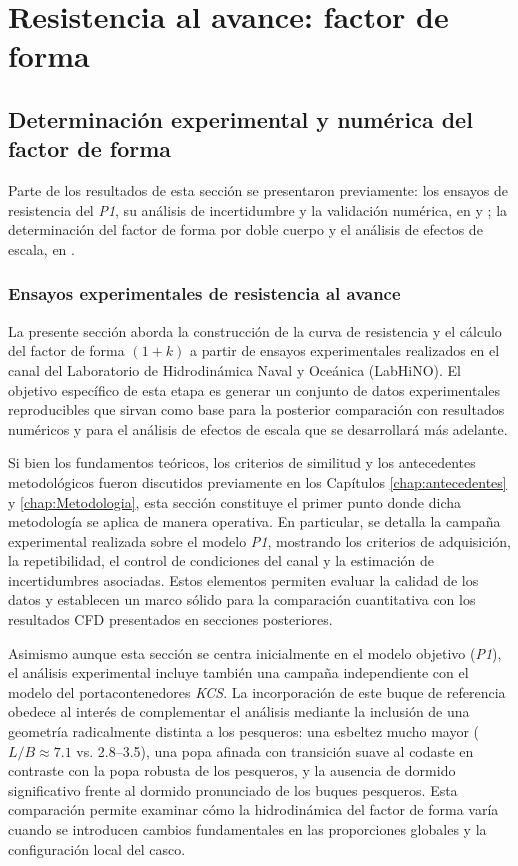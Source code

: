 \chapter{Resistencia al avance: factor de forma} \label{cap:resistencia_factor_de_forma}
\minitoc

\section{Determinación experimental y numérica del factor de forma}

Parte de los resultados de esta sección se presentaron previamente: los
ensayos de resistencia del \textit{P1}, su análisis de incertidumbre y la
validación numérica, en \citet{diazojeda2024bulbous} y \citet{oyuela2024jmse};
la determinación del factor de forma por doble cuerpo y el análisis de efectos
de escala, en \citet{oyuela2026oceaneng}.

\subsection{Ensayos experimentales de resistencia al avance}

La presente sección aborda la construcción de la curva de resistencia y el cálculo del factor de forma $(1+k)$ a partir de ensayos experimentales realizados en el canal del Laboratorio de Hidrodinámica Naval y Oceánica (LabHiNO). El objetivo específico de esta etapa es generar un conjunto de datos experimentales reproducibles que sirvan como base para la posterior comparación con resultados numéricos y para el análisis de efectos de escala que se desarrollará más adelante.

Si bien los fundamentos teóricos, los criterios de similitud y los antecedentes metodológicos fueron discutidos previamente en los Capítulos \ref{chap:antecedentes} y \ref{chap:Metodologia}, esta sección constituye el primer punto donde dicha metodología se aplica de manera operativa. En particular, se detalla la campaña experimental realizada sobre el modelo \textit{P1}, mostrando los criterios de adquisición, la repetibilidad, el control de condiciones del canal y la estimación de incertidumbres asociadas. Estos elementos permiten evaluar la calidad de los datos y establecen un marco sólido para la comparación cuantitativa con los resultados CFD presentados en secciones posteriores.

Asimismo aunque esta sección se centra inicialmente en el modelo objetivo (\textit{P1}), el análisis experimental incluye también una campaña independiente con el modelo del portacontenedores \textit{KCS}. La incorporación de este buque de referencia obedece al interés de complementar el análisis mediante la inclusión de una geometría radicalmente distinta a los pesqueros: una esbeltez mucho mayor ($L/B \approx 7{.}1$ vs. 2.8–3.5), una popa afinada con transición suave al codaste en contraste con la popa robusta de los pesqueros, y la ausencia de dormido significativo frente al dormido pronunciado de los buques pesqueros. Esta comparación permite examinar cómo la hidrodinámica del factor de forma varía cuando se introducen cambios fundamentales en las proporciones globales y la configuración local del casco.

